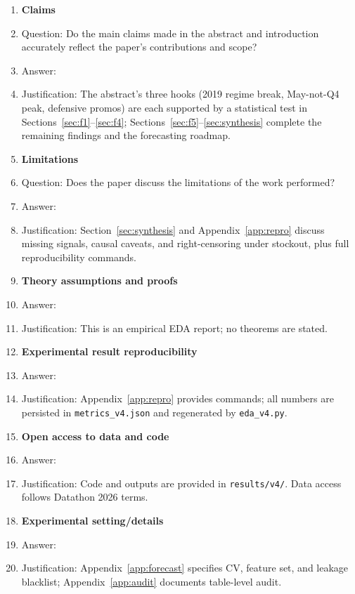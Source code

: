 \documentclass{article}
\begin{document}
\begin{enumerate}

\item {\bf Claims}
    \item[] Question: Do the main claims made in the abstract and introduction accurately reflect the paper's contributions and scope?
    \item[] Answer: \answerYes{}
    \item[] Justification: The abstract's three hooks (2019 regime break, May-not-Q4 peak, defensive promos) are each supported by a statistical test in Sections~\ref{sec:f1}--\ref{sec:f4}; Sections~\ref{sec:f5}--\ref{sec:synthesis} complete the remaining findings and the forecasting roadmap.

\item {\bf Limitations}
    \item[] Question: Does the paper discuss the limitations of the work performed?
    \item[] Answer: \answerYes{}
    \item[] Justification: Section~\ref{sec:synthesis} and Appendix~\ref{app:repro} discuss missing signals, causal caveats, and right-censoring under stockout, plus full reproducibility commands.

\item {\bf Theory assumptions and proofs}
    \item[] Answer: \answerNA{}
    \item[] Justification: This is an empirical EDA report; no theorems are stated.

\item {\bf Experimental result reproducibility}
    \item[] Answer: \answerYes{}
    \item[] Justification: Appendix~\ref{app:repro} provides commands; all numbers are persisted in \texttt{metrics\_v4.json} and regenerated by \texttt{eda\_v4.py}.

\item {\bf Open access to data and code}
    \item[] Answer: \answerYes{}
    \item[] Justification: Code and outputs are provided in \texttt{results/v4/}. Data access follows Datathon 2026 terms.

\item {\bf Experimental setting/details}
    \item[] Answer: \answerYes{}
    \item[] Justification: Appendix~\ref{app:forecast} specifies CV, feature set, and leakage blacklist; Appendix~\ref{app:audit} documents table-level audit.


\end{enumerate}
\end{document}
